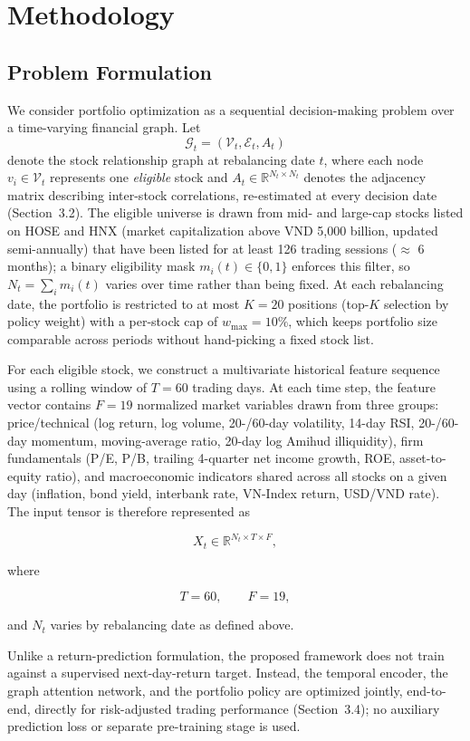 \documentclass[runningheads]{llncs}
\begin{document}
\section{Methodology}

\subsection{Problem Formulation}

We consider portfolio optimization as a sequential decision-making problem over a time-varying financial graph. Let
\[
\mathcal{G}_t=(\mathcal{V}_t,\mathcal{E}_t,A_t)
\]
denote the stock relationship graph at rebalancing date $t$, where each node
$v_i\in\mathcal{V}_t$ represents one \emph{eligible} stock and
$A_t\in\mathbb{R}^{N_t\times N_t}$ denotes the adjacency matrix describing inter-stock correlations, re-estimated at every decision date (Section~3.2). The eligible universe is drawn from mid- and large-cap stocks listed on HOSE and HNX (market capitalization above VND 5{,}000 billion, updated semi-annually) that have been listed for at least 126 trading sessions ($\approx$ 6 months); a binary eligibility mask $m_i(t)\in\{0,1\}$ enforces this filter, so $N_t=\sum_i m_i(t)$ varies over time rather than being fixed. At each rebalancing date, the portfolio is restricted to at most $K=20$ positions (top-$K$ selection by policy weight) with a per-stock cap of $w_{\max}=10\%$, which keeps portfolio size comparable across periods without hand-picking a fixed stock list.

For each eligible stock, we construct a multivariate historical feature sequence using a rolling window of
$T=60$
trading days.
At each time step,
the feature vector contains
$F=19$
normalized market variables drawn from three groups: price/technical (log return, log volume, 20-/60-day volatility, 14-day RSI, 20-/60-day momentum, moving-average ratio, 20-day log Amihud illiquidity), firm fundamentals (P/E, P/B, trailing 4-quarter net income growth, ROE, asset-to-equity ratio), and macroeconomic indicators shared across all stocks on a given day (inflation, bond yield, interbank rate, VN-Index return, USD/VND rate). The input tensor is therefore represented as

\[
X_t
\in
\mathbb{R}^{N_t\times T\times F},
\]

where

\[
T=60,\qquad
F=19,
\]

and $N_t$ varies by rebalancing date as defined above.

Unlike a return-prediction formulation, the proposed framework does not train against a supervised next-day-return target. Instead, the temporal encoder, the graph attention network, and the portfolio policy are optimized jointly, end-to-end, directly for risk-adjusted trading performance (Section~3.4); no auxiliary prediction loss or separate pre-training stage is used.
\end{document}
